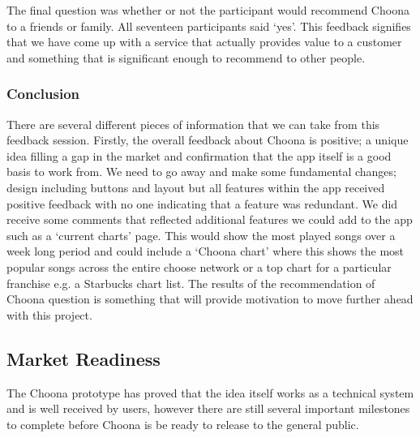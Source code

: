 The final question was whether or not the participant would recommend Choona to a friends or family.  All seventeen participants said `yes'.  This feedback signifies that we have come up with a service that actually provides value to a customer and something that is significant enough to recommend to other people.  

\subsubsection{Conclusion}
There are several different pieces of information that we can take from this feedback session.  Firstly, the overall feedback about Choona is positive; a unique idea filling a gap in the market and confirmation that the app itself is a good basis to work from.  We need to go away and make some fundamental changes; design including buttons and layout but all features within the app received positive feedback with no one indicating that a feature was redundant.  We did receive some comments that reflected additional features we could add to the app such as a `current charts' page.  This would show the most played songs over a week long period and could include a `Choona chart' where this shows the most popular songs across the entire choose network or a top chart for a particular franchise e.g. a Starbucks chart list.  The results of the recommendation of Choona question is something that will provide motivation to move further ahead with this project.

\subsection{Market Readiness}

The Choona prototype has proved that the idea itself works as a technical system and is well received by users, however there are still several important milestones to complete before Choona is be ready to release to the general public.

